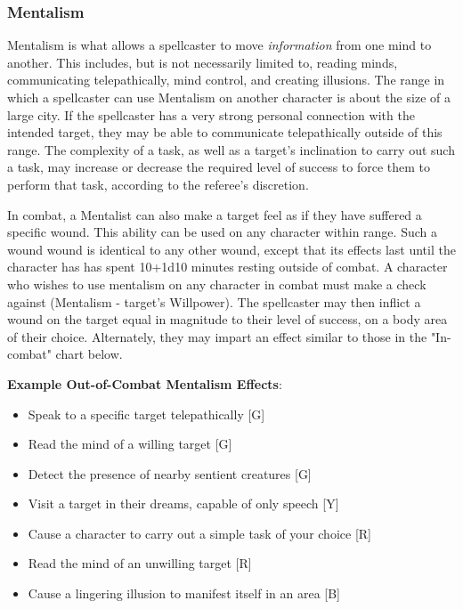 \documentclass[oneside]{book}
\begin{document}
\begin{multicols}{2}
\subsubsection{Mentalism}
Mentalism is what allows a spellcaster to move \emph{information} from one mind to another. This includes, but is not necessarily limited to, reading minds, communicating telepathically, mind control, and creating illusions. The range in which a spellcaster can use Mentalism on another character is about the size of a large city. If the spellcaster has a very strong personal connection with the intended target, they may be able to communicate telepathically outside of this range. The complexity of a task, as well as a target's inclination to carry out such a task, may increase or decrease the required level of success to force them to perform that task, according to the referee's discretion.

In combat, a Mentalist can also make a target feel as if they have suffered a specific wound. This ability can be used on any character within range. Such a wound wound is identical to any other wound, except that its effects last until the character has has spent 10+1d10 minutes resting outside of combat. A character who wishes to use mentalism on any character in combat must make a check against (Mentalism - target's Willpower). The spellcaster may then inflict a wound on the target equal in magnitude to their level of success, on a body area of their choice. Alternately, they may impart an effect similar to those in the "In-combat" chart below.  

\textbf{Example Out-of-Combat Mentalism Effects}:
	\begin{itemize}
		\setlength{\itemsep}{0cm}%
  		\setlength{\parskip}{0cm}%
		\item{ \small Speak to a specific target telepathically [G]}
		\item{ \small Read the mind of a willing target [G]}
		\item{ \small Detect the presence of nearby sentient creatures [G]}
		\item{ \small Visit a target in their dreams, capable of only speech [Y]}
		\item{ \small Cause a character to carry out a simple task of your choice [R]}
		\item{ \small Read the mind of an unwilling target [R]}
		\item{ \small Cause a lingering illusion to manifest itself in an area [B]}
	\end{itemize}
	

\end{multicols}
\end{document}

